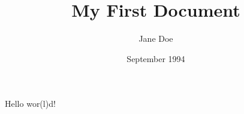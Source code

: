 \documentclass{article}
\title{My First Document}
\author{Jane Doe}
\date{September 1994}
\begin{document}
\maketitle
Hello wor(l)d!
\end{document}
